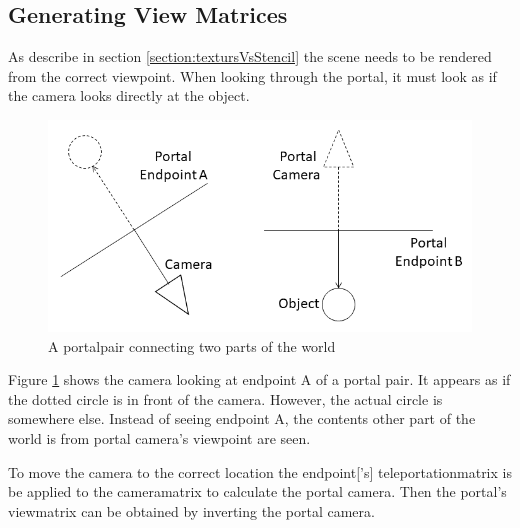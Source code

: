 \subsection{Generating View Matrices}
\label{section:generatingviewmatrices}


As describe in section \ref{section:textursVsStencil} the scene needs to be rendered from the correct viewpoint. When looking through the portal, it must look as if the camera looks directly at the object.

\begin{figure}[H]
	\includegraphics[width=\linewidth]{images/portal.png}
	\caption{A \gls{portalpair} connecting two parts of the world}
	\label{fig:portal}
\end{figure}

Figure \ref{fig:portal} shows the camera looking at endpoint A of a portal pair. It appears as if the dotted circle is in front of the camera. However, the actual circle is somewhere else. Instead of seeing endpoint A, the contents other part of the world is from portal camera's viewpoint are seen.


To move the camera to the correct location the \gls{endpoint}['s] \gls{teleportationmatrix} is be applied to the \gls{cameramatrix} to calculate the portal camera. Then the portal's \gls{viewmatrix} can be obtained by inverting the portal camera.






